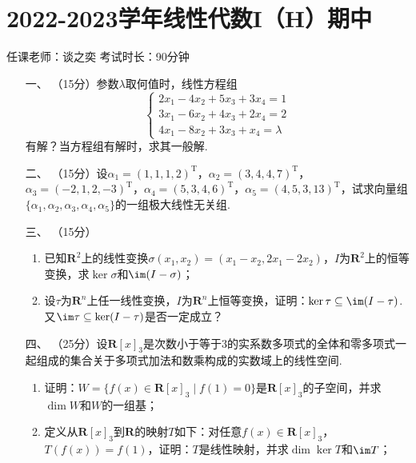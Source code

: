 \section*{2022-2023学年线性代数I（H）期中}
\label{sec:2022-2023-1midtzy}

\begin{center}
    任课老师：谈之奕\hspace{4em} 考试时长：90分钟
\end{center}
\begin{enumerate}
	\item[一、]（15分）参数$\lambda$取何值时，线性方程组
	\[\begin{cases}
        2x_1-4x_2+5x_3+3x_4=1 \\
        3x_1-6x_2+4x_3+2x_4=2 \\
        4x_1-8x_2+3x_3+x_4=\lambda
    \end{cases}\]
    有解？当方程组有解时，求其一般解.
	\item[二、]（15分）设$\alpha_1=(1,1,1,2)^\mathrm{T}$，$\alpha_2=(3,4,4,7)^\mathrm{T}$，$\alpha_3=(-2,1,2,-3)^\mathrm{T}$，$\alpha_4=(5,3,4,6)^\mathrm{T}$，$\alpha_5=(4,5,3,13)^\mathrm{T}$，试求向量组$\{\alpha_1,\alpha_2,\alpha_3,\alpha_4,\alpha_5\}$的一组极大线性无关组.
	\item[三、]（15分）
    \begin{enumerate}[label=(\arabic*)]
        \item 已知$\mathbf{R}^2$上的线性变换$\sigma(x_1,x_2)=(x_1-x_2,2x_1-2x_2)$，$I$为$\mathbf{R}^2$上的恒等变换，求$\ker\sigma$和$\im(I-\sigma)$；

        \item 设$\tau$为$\mathbf{R}^n$上任一线性变换，$I$为$\mathbf{R}^n$上恒等变换，证明：$\ker\tau\subseteq\im(I-\tau)$. 又$\im\tau\subseteq\ker(I-\tau)$是否一定成立？
    \end{enumerate}
	\item[四、]（25分）设$\mathbf{R}[x]_3$是次数小于等于3的实系数多项式的全体和零多项式一起组成的集合关于多项式加法和数乘构成的实数域上的线性空间.
	\begin{enumerate}[label=(\arabic*)]
        \item 证明：$W=\{f(x)\in\mathbf{R}[x]_3\mid f(1)=0\}$是$\mathbf{R}[x]_3$的子空间，并求$\dim W$和$W$的一组基；

        \item 定义从$\mathbf{R}[x]_3$到$\mathbf{R}$的映射$T$如下：对任意$f(x)\in\mathbf{R}[x]_3$，$T(f(x))=f(1)$，证明：$T$是线性映射，并求$\dim\ker T$和$\im T$；


\end{enumerate}
\end{enumerate}
